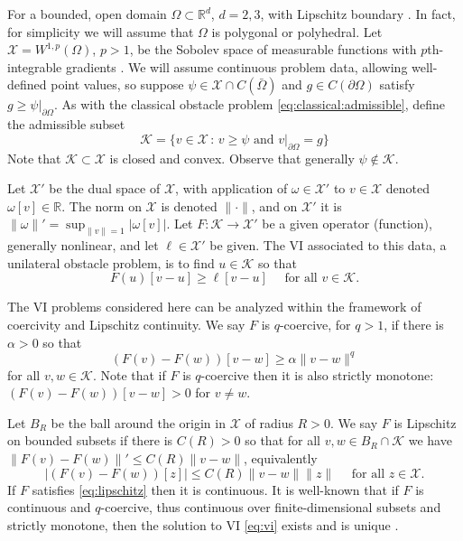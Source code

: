 \documentclass[]{interact}
\theoremstyle{plain}%
\theoremstyle{definition}
\theoremstyle{remark}
\newcommand{\RR}{\mathbb{R}}
\newcommand{\cK}{\mathcal{K}}
\newcommand{\cX}{\mathcal{X}}
\begin{document}
For a bounded, open domain $\Omega \subset \RR^d$, $d=2,3$, with Lipschitz boundary \cite{Ciarlet2002}.  In fact, for simplicity we will assume that $\Omega$ is polygonal or polyhedral.  Let $\cX = W^{1,p}(\Omega)$, $p>1$, be the Sobolev space of measurable functions with $p$th-integrable gradients \cite{Evans2010}.  We will assume continuous problem data, allowing well-defined point values, so suppose $\psi \in \cX \cap C(\bar\Omega)$ and $g\in C(\partial \Omega)$ satisfy $g \ge \psi|_{\partial\Omega}$.  As with the classical obstacle problem \eqref{eq:classical:admissible}, define the admissible subset
\begin{equation} \label{eq:admissible}
\cK = \{v \in \cX \,:\, v \ge \psi \text{ and } v|_{\partial \Omega} = g\}
\end{equation}
Note that $\cK\subset \cX$ is closed and convex.  Observe that generally $\psi\notin\cK$.

Let $\cX'$ be the dual space of $\cX$, with application of $\omega \in \cX'$ to $v\in \cX$ denoted $\omega[v] \in \RR$.  The norm on $\cX$ is denoted $\|\cdot\|$, and on $\cX'$ it is $\|\omega\|' = \sup_{\|v\|=1} |\omega[v]|$.  Let $F:\cK \to \cX'$ be a given operator (function), generally nonlinear, and let $\ell\in \cX'$ be given.  The VI associated to this data, a unilateral obstacle problem, is to find $u\in \cK$ so that
\begin{equation} \label{eq:vi}
F(u)[v - u] \ge \ell[v - u] \quad \text{ for all } v \in \cK.
\end{equation}

The VI problems considered here can be analyzed within the framework of coercivity and Lipschitz continuity.  We say $F$ is $q$-coercive, for $q>1$, if there is $\alpha>0$ so that
\begin{equation} \label{eq:coercive}
(F(v) - F(w))[v - w] \ge \alpha \|v-w\|^q
\end{equation}
for all $v,w \in \cK$.  Note that if $F$ is $q$-coercive then it is also strictly monotone: $(F(v) - F(w))[v - w] > 0$ for $v\ne w$.

Let $B_R$ be the ball around the origin in $\cX$ of radius $R>0$.  We say $F$ is Lipschitz on bounded subsets if there is $C(R)>0$ so that for all $v,w \in B_R\cap \cK$ we have $\|F(v)-F(w)\|' \le C(R) \|v-w\|$, equivalently
\begin{equation} \label{eq:lipschitz}
\left|(F(v)-F(w))[z]\right| \le C(R) \|v-w\| \|z\| \quad \text{ for all } z \in \cX.
\end{equation}
If $F$ satisfies \eqref{eq:lipschitz} then it is continuous.  It is well-known that if $F$ is continuous and $q$-coercive, thus continuous over finite-dimensional subsets and strictly monotone, then the solution to VI \eqref{eq:vi} exists and is unique \cite[Corollary III.1.8]{KinderlehrerStampacchia1980}.
\end{document}
